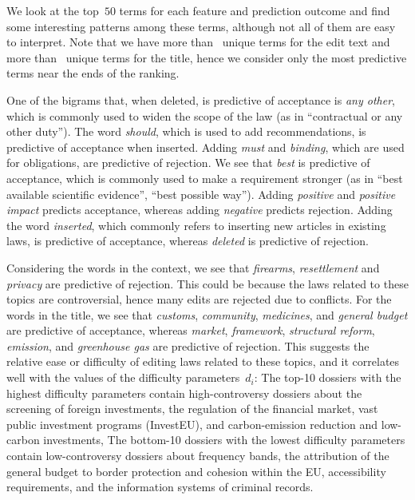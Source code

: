 We look at the top~$50$ terms for each feature and prediction outcome and find some interesting patterns among these terms, although not all of them are easy to interpret.
Note that we have more than~ unique terms for the edit text and more than~ unique terms for the title, hence we consider only the most predictive terms near the ends of the ranking.

One of the bigrams that, when deleted, is predictive of acceptance is \textit{any other}, which is commonly used to widen the scope of the law (as in ``contractual or any other duty'').
The word \textit{should}, which is used to add recommendations, is predictive of acceptance when inserted.
Adding \textit{must} and \textit{binding}, which are used for obligations, are predictive of rejection.
We see that \textit{best} is predictive of acceptance, which is commonly used to make a requirement stronger (as in ``best available scientific evidence'', ``best possible way'').
Adding \textit{positive} and \textit{positive impact} predicts acceptance, whereas adding \textit{negative} predicts rejection.
Adding the word \textit{inserted}, which commonly refers to inserting new articles in existing laws, is predictive of acceptance, whereas \textit{deleted} is predictive of rejection.

Considering the words in the context, we see that \textit{firearms}, \textit{resettlement} and \textit{privacy} are predictive of rejection.
This could be because the laws related to these topics are controversial, hence many edits are rejected due to conflicts.
For the words in the title, we see that \textit{customs}, \textit{community}, \textit{medicines}, and \textit{general budget} are predictive of acceptance, whereas \textit{market}, \textit{framework}, \textit{structural reform}, \textit{emission},  and \textit{greenhouse gas} are predictive of rejection.
This suggests the relative ease or difficulty of editing laws related to these topics, and it correlates well with the values of the difficulty parameters~$d_i$:
The top-10 dossiers with the highest difficulty parameters contain high-controversy dossiers about the screening of foreign investments, the regulation of the financial market, vast public investment programs (InvestEU), and  carbon-emission reduction and low-carbon investments,
The bottom-10 dossiers with the lowest difficulty parameters contain low-controversy dossiers about frequency bands, the attribution of the general budget to border protection and cohesion within the EU, accessibility requirements, and the information systems of criminal records.

